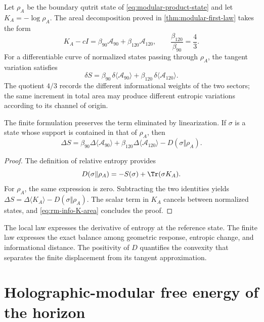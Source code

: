 Let \(\rho_A\) be the boundary qutrit state of
\cref{eq:modular-product-state} and let
\(K_A=-\log\rho_A\). The areal decomposition proved in
\cref{thm:modular-first-law} takes the form
\begin{equation}
 K_A-cI
 =\beta_{90}\mathcal A_{90}
 +\beta_{120}\mathcal A_{120},
 \qquad
 \frac{\beta_{120}}{\beta_{90}}=\frac43.
 \label{eq:rm-info-K-area}
\end{equation}
For a differentiable curve of normalized states passing through
\(\rho_A\), the tangent variation satisfies
\begin{equation}
 \boxed{
 \delta S
 =\beta_{90}\,\delta\langle\mathcal A_{90}\rangle
 +\beta_{120}\,\delta\langle\mathcal A_{120}\rangle.}
 \label{eq:rm-info-first-law}
\end{equation}
The quotient \(4/3\) records the different informational weights of
the two sectors; the same increment in total area may produce
different entropic variations according to its
channel of origin.

The finite formulation preserves the term eliminated by linearization.
If \(\sigma\) is a state whose support is contained in that of
\(\rho_A\), then
\begin{equation}
 \boxed{
 \Delta S
 =\beta_{90}\Delta\langle\mathcal A_{90}\rangle
 +\beta_{120}\Delta\langle\mathcal A_{120}\rangle
 -D(\sigma\Vert\rho_A).}
 \label{eq:rm-info-finite-law}
\end{equation}

\begin{proof}
The definition of relative entropy provides
\[
 D(\sigma\Vert\rho_A)
 =-S(\sigma)+\Tr(\sigma K_A).
\]
For \(\rho_A\), the same expression is zero. Subtracting the two
identities yields
\(\Delta S=\Delta\langle K_A\rangle-D(\sigma\Vert\rho_A)\).
The scalar term in \(K_A\) cancels between normalized states, and
\cref{eq:rm-info-K-area} concludes the proof.
\end{proof}

The local law expresses the derivative of entropy at the reference state. The finite law expresses the exact balance among geometric response, entropic change, and informational distance. The positivity of \(D\) quantifies the convexity that separates the finite displacement from its tangent approximation.

\section{Holographic-modular free energy of the horizon}

